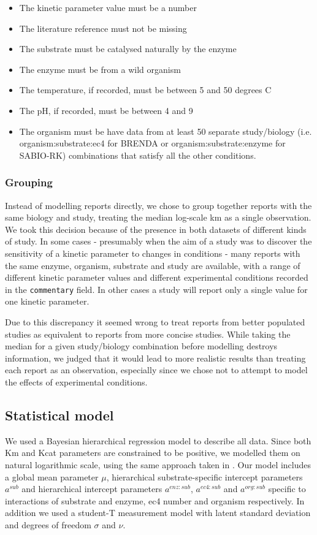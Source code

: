 \documentclass[11pt]{article}
\begin{document}
\begin{itemize}
\item The kinetic parameter value must be a number
\item The literature reference must not be missing
\item The substrate must be catalysed naturally by the enzyme
\item The enzyme must be from a wild organism
\item The temperature, if recorded, must be between 5 and 50 degrees C
\item The pH, if recorded, must be between 4 and 9
\item The organism must be have data from at least 50 separate study/biology
(i.e. organism:substrate:ec4 for BRENDA or organism:substrate:enzyme for
SABIO-RK) combinations that satisfy all the other conditions.
\end{itemize}

\subsubsection{Grouping}
\label{sec:org4f0c10d}
Instead of modelling reports directly, we chose to group together reports with
the same biology and study, treating the median log-scale km as a single
observation. We took this decision because of the presence in both datasets of
different kinds of study. In some cases - presumably when the aim of a study was
to discover the sensitivity of a kinetic parameter to changes in conditions -
many reports with the same enzyme, organism, substrate and study are available,
with a range of different kinetic parameter values and different experimental
conditions recorded in the \texttt{commentary} field. In other cases a study will
report only a single value for one kinetic parameter.

Due to this discrepancy it seemed wrong to treat reports from better populated
studies as equivalent to reports from more concise studies. While taking the
median for a given study/biology combination before modelling destroys
information, we judged that it would lead to more realistic results than
treating each report as an observation, especially since we chose not to
attempt to model the effects of experimental conditions.

\subsection{Statistical model}
\label{sec:org6de2f17}
We used a Bayesian hierarchical regression model to describe all data. Since
both Km and Kcat parameters are constrained to be positive, we modelled them on
natural logarithmic scale, using the same approach taken in . Our model includes a global mean
parameter \(\mu\), hierarchical substrate-specific intercept parameters \(a^{sub}\)
and hierarchical intercept parameters \(a^{enz:sub}\), \(a^{ec4:sub}\) and
\(a^{org:sub}\) specific to interactions of substrate and enzyme, ec4 number and
organism respectively. In addition we used a student-T measurement model with
latent standard deviation and degrees of freedom \(\sigma\) and \(\nu\).
\end{document}
